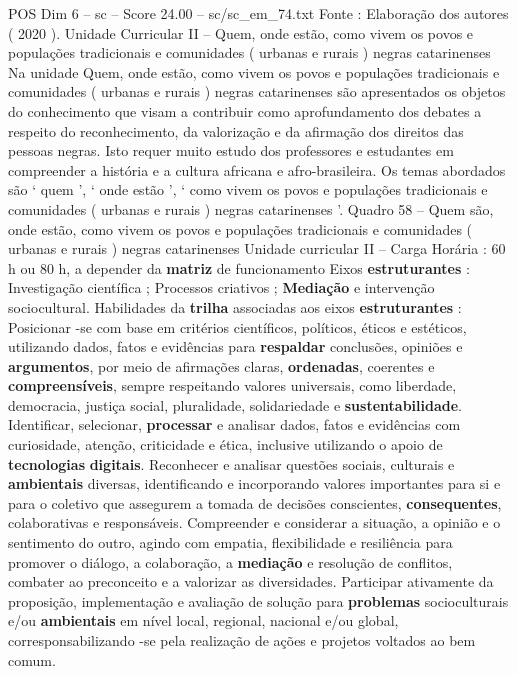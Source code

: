 \begin{textsample}{POS Dim 6 – sc – Score 24.00 – sc/sc\_em\_74.txt}
Fonte : Elaboração dos autores ( 2020 ).
Unidade Curricular II – Quem, onde estão, como vivem os povos e populações tradicionais e comunidades ( urbanas e rurais ) negras catarinenses Na unidade Quem, onde estão, como vivem os povos e populações tradicionais e comunidades ( urbanas e rurais ) negras catarinenses são apresentados os objetos do conhecimento que visam a contribuir como aprofundamento dos debates a respeito do reconhecimento, da valorização e da afirmação dos direitos das pessoas negras.
Isto requer muito estudo dos professores e estudantes em compreender a história e a cultura africana e afro-brasileira.
Os temas abordados são ‘ quem ’, ‘ onde estão ’, ‘ como vivem os povos e populações tradicionais e comunidades ( urbanas e rurais ) negras catarinenses ’.
Quadro 58 – Quem são, onde estão, como vivem os povos e populações tradicionais e comunidades ( urbanas e rurais ) negras catarinenses Unidade curricular II – Carga Horária : 60 h ou 80 h, a depender da \textbf{matriz} de funcionamento Eixos \textbf{estruturantes} : Investigação científica ; Processos criativos ; \textbf{Mediação} e intervenção sociocultural.
Habilidades da \textbf{trilha} associadas aos eixos \textbf{estruturantes} : Posicionar -se com base em critérios científicos, políticos, éticos e estéticos, utilizando dados, fatos e evidências para \textbf{respaldar} conclusões, opiniões e \textbf{argumentos}, por meio de afirmações claras, \textbf{ordenadas}, coerentes e \textbf{compreensíveis}, sempre respeitando valores universais, como liberdade, democracia, justiça social, pluralidade, solidariedade e \textbf{sustentabilidade}.
Identificar, selecionar, \textbf{processar} e analisar dados, fatos e evidências com curiosidade, atenção, criticidade e ética, inclusive utilizando o apoio de \textbf{tecnologias} \textbf{digitais}.
Reconhecer e analisar questões sociais, culturais e \textbf{ambientais} diversas, identificando e incorporando valores importantes para si e para o coletivo que assegurem a tomada de decisões conscientes, \textbf{consequentes}, colaborativas e responsáveis.
Compreender e considerar a situação, a opinião e o sentimento do outro, agindo com empatia, flexibilidade e resiliência para promover o diálogo, a colaboração, a \textbf{mediação} e resolução de conflitos, combater ao preconceito e a valorizar as diversidades.
Participar ativamente da proposição, implementação e avaliação de solução para \textbf{problemas} socioculturais e/ou \textbf{ambientais} em nível local, regional, nacional e/ou global, corresponsabilizando -se pela realização de ações e projetos voltados ao bem comum.

\end{textsample}
